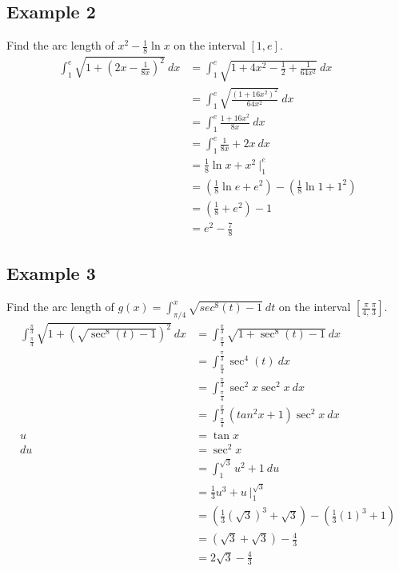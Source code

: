 \documentclass{article}
\theoremstyle{mytheoremstyle}
\theoremstyle{mytheoremstyle}
\theoremstyle{myproblemstyle}
\begin{document}
    \subsection*{Example 2}
    Find the arc length of $x^2-\frac{1}{8} \ln x$ on the interval $[1, e]$.
    \begin{align*}
        \int_{1}^{e} \sqrt{1+(2x-\frac{1}{8x})^2} \ dx
        &= \int_{1}^{e} \sqrt{1 + 4x^2 -\frac{1}{2} + \frac{1}{64x^2}} \ dx \\
        &= \int_{1}^{e} \sqrt{\frac{(1+16x^2)^2}{64x^2}} \ dx \\
        &= \int_{1}^{e} \frac{1+16x^2}{8x} \ dx \\
        &= \int_{1}^{e} \frac{1}{8x} + 2x \ dx \\
        &= \frac{1}{8} \ln x + x^2 \ \Big|_{1}^{e} \\
        &= (\frac{1}{8} \ln e + e^2) -(\frac{1}{8} \ln 1 + 1^2) \\
        &= (\frac{1}{8} + e^2) - 1 \\
        &= e^2 - \frac{7}{8}
    \end{align*}

    \subsection*{Example 3}
    Find the arc length of $g(x)=\int_{\pi/4}^{x} \sqrt{sec^8(t) -1} \ dt$ on
    the interval $[ \frac{\pi}{4,} \frac{\pi}{3} ]$.
    \begin{align*}
        \int_{\frac{\pi}{4}}^{\frac{\pi}{3}} \sqrt{1+(\sqrt{\sec^8(t) -1})^2} \ dx
        &= \int_{\frac{\pi}{4}}^{\frac{\pi}{3}} \sqrt{1+\sec^8(t) -1} \ dx \\
        &= \int_{\frac{\pi}{4}}^{\frac{\pi}{3}} \sec^4(t)\ dx \\
        &= \int_{\frac{\pi}{4}}^{\frac{\pi}{3}} \sec^2 x \sec^2 x\ dx \\
        &= \int_{\frac{\pi}{4}}^{\frac{\pi}{3}} (tan^2 x + 1) \sec^2 x\ dx \\
        u &= \tan x \\
        du &= \sec^2 x \\
        &= \int_{1}^{\sqrt{3}} u^2 + 1 \ du \\
        &= \frac{1}{3} u^3 + u \ \Big|_{1}^{\sqrt{3}} \\
        &= (\frac{1}{3} (\sqrt{3})^3 + \sqrt{3}) - (\frac{1}{3} (1)^3 + 1) \\
        &= (\sqrt{3} + \sqrt{3}) - \frac{4}{3} \\
        &= 2\sqrt{3} - \frac{4}{3}
    \end{align*}
\end{document}

